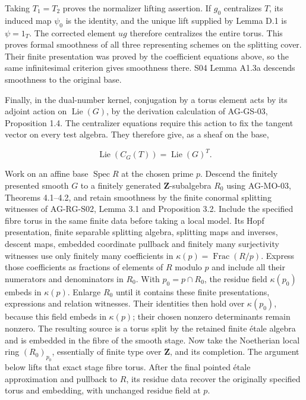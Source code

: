 \documentclass[11pt,a4paper,openany]{report}
\begin{document}
Taking \(T_1=T_2\) proves the normalizer lifting assertion. If \(g_0\) centralizes \(T\), its induced map \(\psi_0\) is the identity, and the unique lift supplied by Lemma D.1 is \(\psi=1_T\). The corrected element \(ug\) therefore centralizes the entire torus. This proves formal smoothness of all three representing schemes on the splitting cover. Their finite presentation was proved by the coefficient equations above, so the same infinitesimal criterion gives smoothness there. S04 Lemma A1.3a descends smoothness to the original base.

Finally, in the dual-number kernel, conjugation by a torus element acts by its adjoint action on \(\operatorname{Lie}(G)\), by the derivation calculation of AG-GS-03, Proposition 1.4. The centralizer equations require this action to fix the tangent vector on every test algebra. They therefore give, as a sheaf on the base,

\[
\operatorname{Lie}(C_G(T))=\operatorname{Lie}(G)^T.
\]

Work on an affine base \(\operatorname{Spec}R\) at the chosen prime \(p\). Descend the finitely presented smooth \(G\) to a finitely generated \(\mathbf Z\)-subalgebra \(R_0\) using AG-MO-03, Theorems 4.1--4.2, and retain smoothness by the finite conormal splitting witnesses of AG-RG-S02, Lemma 3.1 and Proposition 3.2. Include the specified fibre torus in the same finite data before taking a local model. Its Hopf presentation, finite separable splitting algebra, splitting maps and inverses, descent maps, embedded coordinate pullback and finitely many surjectivity witnesses use only finitely many coefficients in \(\kappa(p)=\operatorname{Frac}(R/p)\). Express those coefficients as fractions of elements of \(R\) modulo \(p\) and include all their numerators and denominators in \(R_0\). With \(p_0=p\cap R_0\), the residue field \(\kappa(p_0)\) embeds in \(\kappa(p)\). Enlarge \(R_0\) until it contains these finite presentations, expressions and relation witnesses. Their identities then hold over \(\kappa(p_0)\), because this field embeds in \(\kappa(p)\); their chosen nonzero determinants remain nonzero. The resulting source is a torus split by the retained finite étale algebra and is embedded in the fibre of the smooth stage. Now take the Noetherian local ring \((R_0)_{p_0}\), essentially of finite type over \(\mathbf Z\), and its completion. The argument below lifts that exact stage fibre torus. After the final pointed étale approximation and pullback to \(R\), its residue data recover the originally specified torus and embedding, with unchanged residue field at \(p\).
\end{document}
